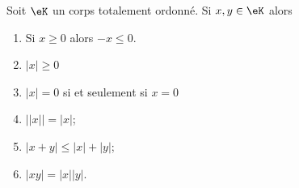 \begin{lemma}  \label{LemooANTJooYxQZDw}
    Soit \( \eK\) un corps totalement ordonné. Si \( x,y\in \eK\) alors
    \begin{enumerate}
        \item       \label{ItemooNVDIooSuiSoB}
          Si \( x\geq 0\) alors \( -x\leq 0\).
        \item
          \( | x |\geq 0\)
        \item
          \( | x |=0\) si et seulement si \( x=0\)
        \item
          \( \bigl|| x |\bigr| = |x|\);
        \item\label{ItemooOMKNooRlanvk}
          \( | x+y |\leq | x |+| y |\);
        \item\label{ItemooOMKNooRlanvki}
         \( | xy | = |x || y | \).
    \end{enumerate}
\end{lemma}

